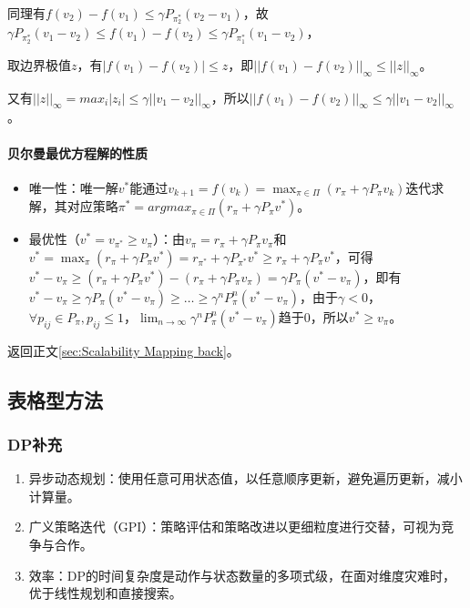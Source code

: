 \documentclass[
12pt, %
a4paper, 
oneside, %
headinclude,footinclude, %
]{scrartcl}
\begin{document}
同理有$ f(v_2) - f(v_1) \leq \gamma P_{\pi_2^*} (v_2 - v_1) $，故$ \gamma P_{\pi_2^*} (v_1 - v_2)\leq f(v_1) - f(v_2) \leq \gamma P_{\pi_1^*} (v_1 - v_2) $，

取边界极值$ z $，有$ |f(v_1) - f(v_2)| \leq z $，即$ ||f(v_1) - f(v_2)||_\infty \leq ||z||_\infty $。

又有$ ||z||_\infty = max_i |z_i| \leq \gamma ||v_1 - v_2||_\infty $，所以$ ||f(v_1) - f(v_2)||_\infty \leq \gamma ||v_1 - v_2||_\infty $。
\paragraph{贝尔曼最优方程解的性质}
\begin{itemize}
\item 唯一性：唯一解$ v^* $能通过$ v_{k + 1} = f(v_k) = \max_{\pi \in \Pi} (r_\pi + \gamma P_\pi v_k) $迭代求解，其对应策略$ \pi^* = argmax_{\pi \in \Pi}(r_\pi + \gamma P_\pi v^*) $。
\item 最优性（$ v^* = v_{\pi^*} \geq v_{\pi} $）：由$ v_{\pi} = r_{\pi} + \gamma P_{\pi} v_{\pi} $和$ v^* = \max_{\pi}(r_{\pi} + \gamma P_{\pi} v^*) = r_{\pi^*} + \gamma P_{\pi^*} v^* \geq r_{\pi} + \gamma P_{\pi} v^* $，可得$ v^* - v_{\pi} \geq (r_{\pi} + \gamma P_{\pi} v^*) - (r_{\pi} + \gamma P_{\pi} v_{\pi}) = \gamma P_{\pi}(v^* - v_{\pi}) $，即有$ v^* - v_{\pi} \geq \gamma P_{\pi}(v^* - v_{\pi}) \geq \dots \geq \gamma^n P_{\pi}^n(v^* - v_{\pi}) $，由于$ \gamma < 0 $，$ \forall p_{ij} \in P_{\pi}, p_{ij} \leq 1 $，$ \lim_{n \to \infty} \gamma^n P_{\pi}^n(v^* - v_{\pi}) $趋于$ 0 $，所以$ v^* \geq v_{\pi} $。
\end{itemize}

返回正文\ref{sec:Scalability Mapping back}。
\subsection[表格型方法]{表格型方法}
\subsubsection[DP补充]{DP补充}\label{sec:DP}
\begin{enumerate}
\item 异步动态规划：使用任意可用状态值，以任意顺序更新，避免遍历更新，减小计算量。
\item 广义策略迭代（GPI）：策略评估和策略改进以更细粒度进行交替，可视为竞争与合作。
\item 效率：DP的时间复杂度是动作与状态数量的多项式级，在面对维度灾难时，优于线性规划和直接搜索。
\end{enumerate}
\end{document}
